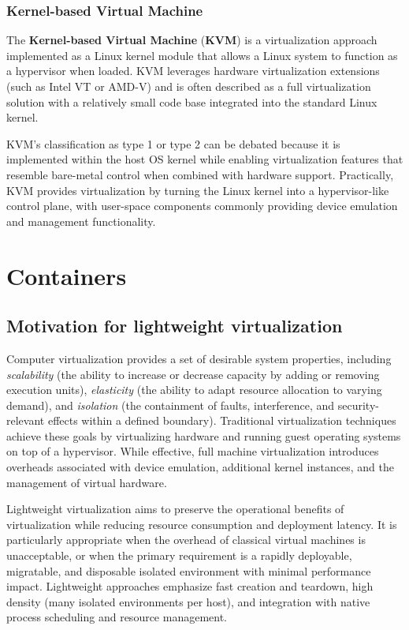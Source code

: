 \documentclass[11pt,a4paper,openany]{report}
\begin{document}
\subsection{Kernel-based Virtual Machine}

The \textbf{Kernel-based Virtual Machine} (\textbf{KVM}) is a virtualization approach implemented as a Linux kernel module that allows a Linux system to function as a hypervisor when loaded. KVM leverages hardware virtualization extensions (such as Intel VT or AMD-V) and is often described as a full virtualization solution with a relatively small code base integrated into the standard Linux kernel.

KVM's classification as type 1 or type 2 can be debated because it is implemented within the host OS kernel while enabling virtualization features that resemble bare-metal control when combined with hardware support. Practically, KVM provides virtualization by turning the Linux kernel into a hypervisor-like control plane, with user-space components commonly providing device emulation and management functionality.

\chapter{Containers}

\section{Motivation for lightweight virtualization}

Computer virtualization provides a set of desirable system properties, including \emph{scalability} (the ability to increase or decrease capacity by adding or removing execution units), \emph{elasticity} (the ability to adapt resource allocation to varying demand), and \emph{isolation} (the containment of faults, interference, and security-relevant effects within a defined boundary). Traditional virtualization techniques achieve these goals by virtualizing hardware and running guest operating systems on top of a hypervisor. While effective, full machine virtualization introduces overheads associated with device emulation, additional kernel instances, and the management of virtual hardware.

Lightweight virtualization aims to preserve the operational benefits of virtualization while reducing resource consumption and deployment latency. It is particularly appropriate when the overhead of classical virtual machines is unacceptable, or when the primary requirement is a rapidly deployable, migratable, and disposable isolated environment with minimal performance impact. Lightweight approaches emphasize fast creation and teardown, high density (many isolated environments per host), and integration with native process scheduling and resource management.
\end{document}
